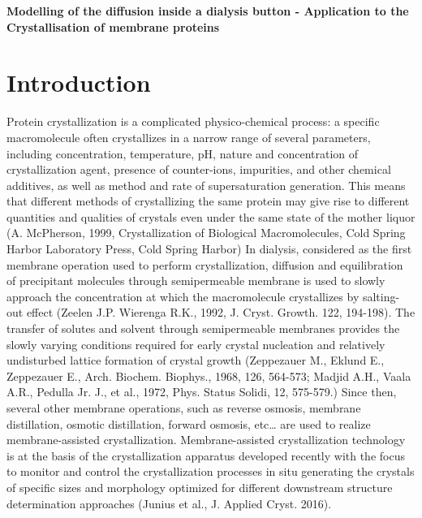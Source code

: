 \documentclass[11ptm,oneside,a4paper]{report}
\begin{document}
\begin{center}
\Large\textbf{Modelling of the diffusion inside a dialysis button - 
Application to the Crystallisation of membrane proteins} \\
\end{center}



\section{Introduction}

Protein crystallization is a complicated physico-chemical process: a specific macromolecule often crystallizes in a narrow range of several parameters, including concentration, temperature, pH, nature and concentration of crystallization agent, presence of counter-ions, impurities, and other chemical additives, as well as method and rate of supersaturation generation. This means that different methods of crystallizing the same protein may give rise to different quantities and qualities of crystals even under the same state of the mother liquor (A. McPherson, 1999, Crystallization of Biological Macromolecules, Cold Spring Harbor Laboratory Press, Cold Spring Harbor) 
In dialysis, considered as the first membrane operation used to perform crystallization, diffusion and equilibration of precipitant molecules through semipermeable membrane is used to slowly approach the concentration at which the macromolecule crystallizes by salting-out effect (Zeelen J.P. Wierenga R.K., 1992, J. Cryst. Growth. 122, 194-198). The transfer of solutes and solvent through semipermeable membranes provides the slowly varying conditions required for early crystal nucleation and relatively undisturbed lattice formation of crystal growth (Zeppezauer M., Eklund E., Zeppezauer E., Arch. Biochem. Biophys., 1968, 126, 564-573;  Madjid A.H., Vaala A.R., Pedulla Jr. J., et al., 1972, Phys. Status Solidi, 12, 575-579.) Since then, several other membrane operations, such as reverse osmosis, membrane distillation, osmotic distillation, forward osmosis, etc… are used to realize membrane-assisted crystallization. 
Membrane-assisted crystallization technology is at the basis of the crystallization apparatus developed recently with the focus to monitor and control the crystallization processes in situ generating the crystals of specific sizes and morphology optimized for different downstream structure determination approaches (Junius et al., J. Applied Cryst. 2016). 
\end{document}
